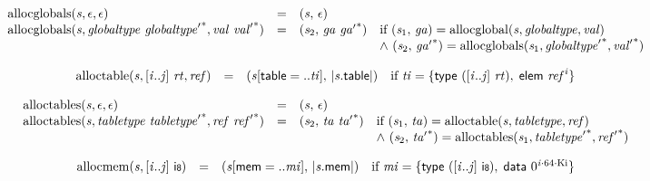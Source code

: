 $$
\begin{array}{@{}lcl@{}l@{}}
{\mathrm{allocglobals}}({\mathit{s}}, \epsilon, \epsilon) &=& ({\mathit{s}},\, \epsilon) &  \\
{\mathrm{allocglobals}}({\mathit{s}}, {\mathit{globaltype}}~{{\mathit{globaltype}'}^\ast}, {\mathit{val}}~{{\mathit{val}'}^\ast}) &=& ({\mathit{s}}_{{2}},\, {\mathit{ga}}~{{\mathit{ga}'}^\ast}) &\quad
  \mbox{if}~({\mathit{s}}_{{1}},\, {\mathit{ga}}) = {\mathrm{allocglobal}}({\mathit{s}}, {\mathit{globaltype}}, {\mathit{val}}) \\
 &&&\quad {\land}~({\mathit{s}}_{{2}},\, {{\mathit{ga}'}^\ast}) = {\mathrm{allocglobals}}({\mathit{s}}_{{1}}, {{\mathit{globaltype}'}^\ast}, {{\mathit{val}'}^\ast}) \\
\end{array}
$$

$$
\begin{array}{@{}lcl@{}l@{}}
{\mathrm{alloctable}}({\mathit{s}}, [{\mathit{i}} .. {\mathit{j}}]~{\mathit{rt}}, {\mathit{ref}}) &=& ({\mathit{s}}[\mathsf{table} = ..{\mathit{ti}}],\, {|{\mathit{s}}.\mathsf{table}|}) &\quad
  \mbox{if}~{\mathit{ti}} = \{ \begin{array}[t]{@{}l@{}}
\mathsf{type}~([{\mathit{i}} .. {\mathit{j}}]~{\mathit{rt}}),\; \mathsf{elem}~{{\mathit{ref}}^{{\mathit{i}}}} \}\end{array} \\
\end{array}
$$

$$
\begin{array}{@{}lcl@{}l@{}}
{\mathrm{alloctables}}({\mathit{s}}, \epsilon, \epsilon) &=& ({\mathit{s}},\, \epsilon) &  \\
{\mathrm{alloctables}}({\mathit{s}}, {\mathit{tabletype}}~{{\mathit{tabletype}'}^\ast}, {\mathit{ref}}~{{\mathit{ref}'}^\ast}) &=& ({\mathit{s}}_{{2}},\, {\mathit{ta}}~{{\mathit{ta}'}^\ast}) &\quad
  \mbox{if}~({\mathit{s}}_{{1}},\, {\mathit{ta}}) = {\mathrm{alloctable}}({\mathit{s}}, {\mathit{tabletype}}, {\mathit{ref}}) \\
 &&&\quad {\land}~({\mathit{s}}_{{2}},\, {{\mathit{ta}'}^\ast}) = {\mathrm{alloctables}}({\mathit{s}}_{{1}}, {{\mathit{tabletype}'}^\ast}, {{\mathit{ref}'}^\ast}) \\
\end{array}
$$

$$
\begin{array}{@{}lcl@{}l@{}}
{\mathrm{allocmem}}({\mathit{s}}, [{\mathit{i}} .. {\mathit{j}}]~\mathsf{i{\scriptstyle8}}) &=& ({\mathit{s}}[\mathsf{mem} = ..{\mathit{mi}}],\, {|{\mathit{s}}.\mathsf{mem}|}) &\quad
  \mbox{if}~{\mathit{mi}} = \{ \begin{array}[t]{@{}l@{}}
\mathsf{type}~([{\mathit{i}} .. {\mathit{j}}]~\mathsf{i{\scriptstyle8}}),\; \mathsf{data}~{0^{{\mathit{i}} \cdot 64 \cdot {\mathrm{Ki}}}} \}\end{array} \\
\end{array}
$$

